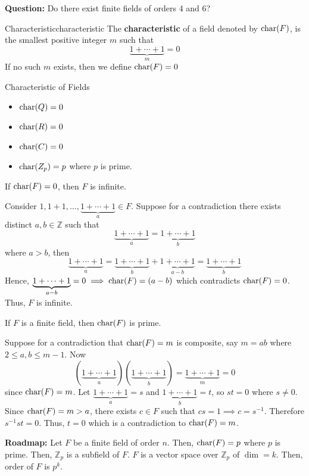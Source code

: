 \textbf{Question:} Do there exist finite fields of orders $ 4 $ and $ 6 $?

\begin{Definition}{Characteristic}{characteristic}
    The \textbf{characteristic} of a field denoted by $ \operatorname{char}(F) $, is the smallest
    positive integer $ m $ such that
    \[ \underbrace{1+\cdots+1}_{m}=0 \]
    If no such $ m $ exists, then we define $ \operatorname{char}(F)=0 $
\end{Definition}

\begin{Example}{Characteristic of Fields}{}
    \begin{itemize}
        \item $ \operatorname{char}(\relax{Q})=0 $
        \item $ \operatorname{char}(\relax{R})=0 $
        \item $ \operatorname{char}(\relax{C})=0 $
        \item $ \operatorname{char}(\relax{Z}_p)=p $ where $ p $ is prime.
    \end{itemize}
\end{Example}

\begin{Theorem}{}{}
    If $ \operatorname{char}(F)=0 $, then $ F $ is infinite.
\end{Theorem}

\begin{Proof}{}{}
    Consider $ 1,1+1,\ldots,\underbrace{1+\cdots+1}_{a}\in F $.
    Suppose for a contradiction there exists distinct $ a,b\in\mathbb{Z} $
    such that
    \[ \underbrace{1+\cdots+1}_{a}=\underbrace{1+\cdots+1}_{b} \]
    where $ a>b $, then
    \[ \underbrace{1+\cdots+1}_{a}=\underbrace{1+\cdots+1}_{b}+
        \underbrace{1+\cdots+1}_{a-b}=\underbrace{1+\cdots+1}_{b} \]
    Hence, $ \underbrace{1+\cdots+1}_{a-b}=0\implies \operatorname{char}(F)=(a-b) $
    which contradicts $ \operatorname{char}(F)=0 $. Thus, $ F $ is infinite.
\end{Proof}

\begin{Theorem}{}{}
    If $ F $ is a finite field, then $ \operatorname{char}(F) $ is prime.
\end{Theorem}

\begin{Proof}{}{}
    Suppose for a contradiction that $ \operatorname{char}(F)=m $ is composite,
    say $ m=ab $ where
    $ 2\leqslant a,b\leqslant m-1 $. Now
    \[ (\underbrace{1+\cdots+1}_{a})(\underbrace{1+\cdots+1}_{b})
        =\underbrace{1+\cdots+1}_{m}=0 \]
    since $ \operatorname{char}(F)=m $. Let $ \underbrace{1+\cdots+1}_{a}=s $
    and $ \underbrace{1+\cdots+1}_{b}=t $, so $ st=0 $ where $ s\neq 0 $.
    Since $ \operatorname{char}(F)=m>a $, there exists $ c\in F $ such that
    $ cs=1 \implies c=s^{-1} $. Therefore $ s^{-1}st=0 $. Thus,
    $ t=0 $ which is a contradiction to $ \operatorname{char}(F)=m $.
\end{Proof}

\textbf{Roadmap:} Let $ F $ be a finite field of order $ n $.
Then, $ \operatorname{char}(F)=p $ where $ p $ is prime. Then, $ \mathbb{Z}_p $ is a subfield
of $ F $. $ F $ is a vector space over $ \mathbb{Z}_p $ of $ \dim=k $.
Then, order of $ F $ is $ p^k $.
